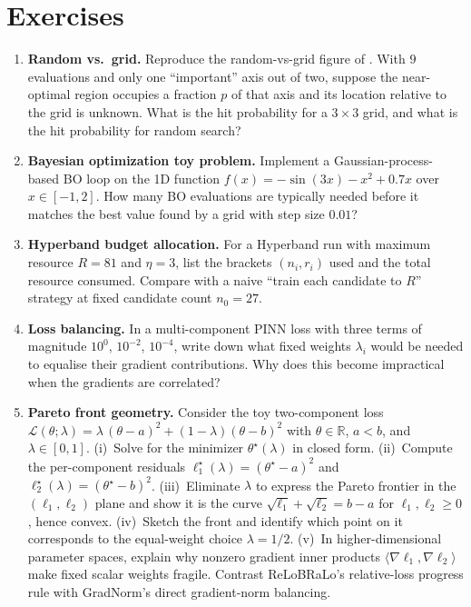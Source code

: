 \documentclass[11pt,a4paper]{report}
\begin{document}
\section*{Exercises}
\begin{enumerate}[itemsep=4pt, leftmargin=*]
\item\label{ex:ch4:1} \textbf{Random vs.\ grid.}  Reproduce the random-vs-grid figure of \citet{bergstra2012random}.  With $9$ evaluations and only one ``important'' axis out of two, suppose the near-optimal region occupies a fraction $p$ of that axis and its location relative to the grid is unknown.  What is the hit probability for a $3\times 3$ grid, and what is the hit probability for random search?
\item\label{ex:ch4:2} \textbf{Bayesian optimization toy problem.}  Implement a Gaussian-process-based BO loop on the 1D function $f(x) = -\sin(3x) - x^2 + 0.7x$ over $x \in [-1,2]$.  How many BO evaluations are typically needed before it matches the best value found by a grid with step size $0.01$?
\item\label{ex:ch4:3} \textbf{Hyperband budget allocation.}  For a Hyperband run with maximum resource $R=81$ and $\eta=3$, list the brackets $(n_i, r_i)$ used and the total resource consumed.  Compare with a naive ``train each candidate to $R$'' strategy at fixed candidate count $n_0 = 27$.
\item\label{ex:ch4:4} \textbf{Loss balancing.}  In a multi-component PINN loss with three terms of magnitude $10^0$, $10^{-2}$, $10^{-4}$, write down what fixed weights $\lambda_i$ would be needed to equalise their gradient contributions.  Why does this become impractical when the gradients are correlated?
\item\label{ex:ch4:5} \textbf{Pareto front geometry.}  Consider the toy two-component loss $\mathcal{L}(\theta;\lambda) = \lambda\,(\theta - a)^2 + (1-\lambda)(\theta - b)^2$ with $\theta \in \mathbb{R}$, $a < b$, and $\lambda \in [0,1]$.  (i)~Solve for the minimizer $\theta^\star(\lambda)$ in closed form.  (ii)~Compute the per-component residuals $\ell_1^\star(\lambda) = (\theta^\star - a)^2$ and $\ell_2^\star(\lambda) = (\theta^\star - b)^2$.  (iii)~Eliminate $\lambda$ to express the Pareto frontier in the $(\ell_1, \ell_2)$ plane and show it is the curve $\sqrt{\ell_1} + \sqrt{\ell_2} = b - a$ for $\ell_1, \ell_2 \ge 0$, hence convex.  (iv)~Sketch the front and identify which point on it corresponds to the equal-weight choice $\lambda = 1/2$.  (v)~In higher-dimensional parameter spaces, explain why nonzero gradient inner products $\langle\nabla \ell_1, \nabla \ell_2\rangle$ make fixed scalar weights fragile.  Contrast ReLoBRaLo's relative-loss progress rule with GradNorm's direct gradient-norm balancing.

\end{enumerate}
\end{document}
